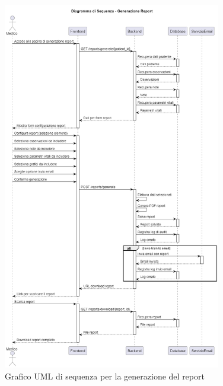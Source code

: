 \documentclass[12pt,a4paper,oneside]{report}
\begin{document}
\begin{figure}[H]
    \centering
    \includegraphics[width=0.85\textwidth]{images/uml/ReportGeneration.png}
    \caption{Grafico UML di sequenza per la generazione del report}
    \label{fig:uml-seq-report}
\end{figure}
\end{document}
